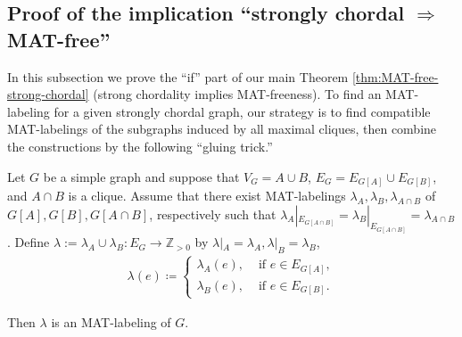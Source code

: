 \subsection{Proof of the implication ``strongly chordal  \texorpdfstring{$\Rightarrow$}{implies} MAT-free''}
\label{sub:if-part}
 
In this subsection we prove the ``if'' part of our main Theorem \ref{thm:MAT-free-strong-chordal} (strong chordality implies MAT-freeness). 
To find an MAT-labeling for a given strongly chordal graph, our strategy is to find compatible MAT-labelings of the subgraphs induced by all maximal cliques, then combine the constructions by the following ``gluing trick.''
\begin{theorem}
\label{glue}
Let $ G $ be a simple graph and suppose that $ V_{G} = A \cup B$, $E_{G} = E_{G[A]} \cup E_{G[B]} $, and $ A \cap B $ is a clique. 
Assume that there exist MAT-labelings $ \lambda_{A}, \lambda_{B}, \lambda_{A \cap B} $ of $ G[A], G[B], G[A\cap B] $, respectively  such that $ \lambda_{A}|_{E_{G[A\cap B]}} = \lambda_{B}|_{E_{G[A\cap B]}} =\lambda_{A\cap B}$. 
Define $ \lambda :=\lambda_{A} \cup \lambda_{B} \colon E_{G} \to \mathbb{Z}_{>0} $ by $\lambda|_A = \lambda_{A}, \lambda|_B = \lambda_{B}$, \ie 
\begin{align*}
\lambda(e) \coloneqq \begin{cases}
\lambda_{A}(e), & \text{ if } e \in E_{G[A]}, \\
\lambda_{B}(e), & \text{ if } e \in E_{G[B]}. 
\end{cases}
\end{align*}
\end{theorem}
\noindent
Then $ \lambda $ is an MAT-labeling of $ G $.
 

